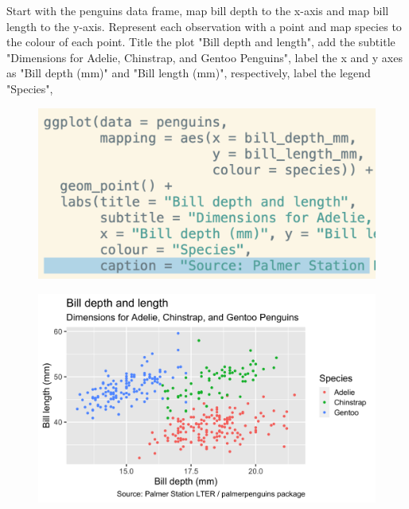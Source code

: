 \documentclass[11pt]{beamer}
\begin{document}
	\begin{frame}
	
	\small{Start with the penguins data frame, map bill depth to the x-axis and map bill length to the y-axis. Represent each observation with a point and map species to the colour of each point. Title the plot "Bill depth and length", add the subtitle "Dimensions for Adelie, Chinstrap, and Gentoo Penguins", label the x and y axes as "Bill depth (mm)" and "Bill length (mm)", respectively, label the legend "Species", }
	
	\begin{minipage}[t]{0.5\linewidth}
		\begin{figure}
			\centering
			\includegraphics[width=1\linewidth]{Images/S2/code/s15}
			
		\end{figure}
	\end{minipage}%
	\begin{minipage}[t]{0.5\linewidth}
		
		\begin{figure}
			\centering
			\includegraphics[width=1\linewidth]{Images/S2/penguins-9-1}
			
		\end{figure}
		
		
	\end{minipage}
	
\end{frame}
\end{document}
